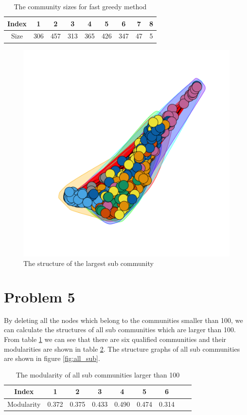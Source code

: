 \documentclass{article}
\begin{document}
\begin {table}[htbp]
\caption{The community sizes for fast greedy method}
\begin{adjustbox}{center}
\label{tb:p4_comsize_fgc}
\begin{tabular}{|c|c|c|c|c|c|c|c|c|}
\hline
Index&1&2&3&4&5&6&7&8\\
\hline
Size&306&457&313&365&426&347&47&5\\
\hline
\end{tabular}
\end{adjustbox}
\end{table}

\begin{figure}[htbp]
\centering
\includegraphics[width=.6\textwidth]{large_sub_com.png}
\caption{The structure of the largest sub community}
\label{fig:fgc_large}
\end{figure}

\section{Problem 5}
By deleting all the nodes which belong to the communities smaller than 100, we can calculate the structures of all sub communities which are larger than 100. From table \ref{tb:p4_comsize_fgc} we can see that there are six qualified communities and their modularities are shown in table \ref{tb:p4_subcom}. The structure graphs of all sub communities are shown in figure \ref{fig:all_sub}.

\begin {table}[htbp]
\caption{The modularity of all sub communities larger than 100}
\begin{adjustbox}{center}
\label{tb:p4_subcom}
\begin{tabular}{|c|c|c|c|c|c|c|c|c|}
\hline
Index&1&2&3&4&5&6\\
\hline
Modularity&0.372& 0.375& 0.433& 0.490& 0.474& 0.314\\
\hline
\end{tabular}
\end{adjustbox}
\end{table}
\end{document}
